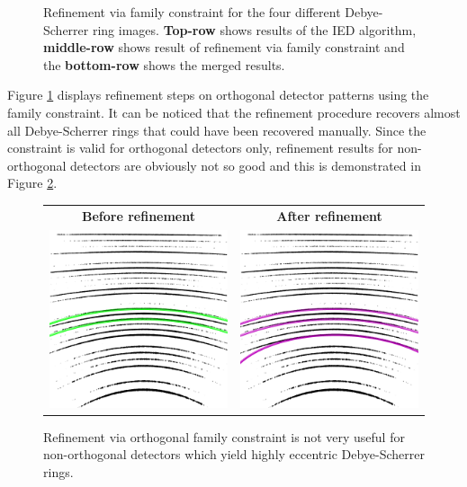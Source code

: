 \documentclass[preprint]{iucr}              %
\newcommand\dsr{Debye-Scherrer ring}
\newcommand\dsrs{Debye-Scherrer rings}
\begin{document}
\begin{figure}
\begin{tabular}{ll|l|l|l}
\end{tabular}

\label{fig:family1}
\caption {Refinement via family constraint for the four different {\dsr} images. \textbf{Top-row} shows results of the IED algorithm, \textbf{middle-row} shows result of refinement via family constraint and the \textbf{bottom-row} shows the merged results.}

\end{figure}

Figure \ref{fig:family1} displays refinement steps on orthogonal detector patterns using the family constraint. It can be noticed that the refinement procedure recovers almost all \dsrs{} that could have been recovered manually. Since the constraint is valid for orthogonal detectors only, refinement results for non-orthogonal detectors are obviously not so good and this is demonstrated in Figure \ref{fig:family_tilted}.

\begin{figure}
\centering
\begin{tabular}{cc}

\textbf{Before refinement} & \textbf{After refinement}
\\
\includegraphics[width=.35\linewidth,height=.45\textheight,keepaspectratio]{withoutRanks/o_tilted_006__woRank.png}
&
\includegraphics[width=.35\linewidth,height=.45\textheight,keepaspectratio]{Merged/o_tilted_006__Merged.png}
\end{tabular}

\label{fig:family_tilted}
\caption {Refinement via orthogonal family constraint is not very useful for non-orthogonal detectors which yield highly eccentric \dsrs.}
\end{figure}
\end{document}
